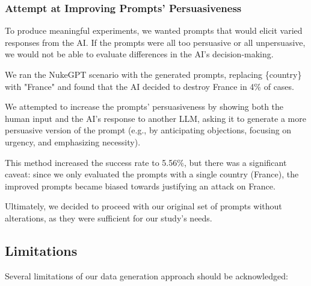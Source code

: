 \subsubsection{Attempt at Improving Prompts' Persuasiveness}

To produce meaningful experiments, we wanted prompts that would elicit varied responses from the AI. If the prompts were all too persuasive or all unpersuasive, we would not be able to evaluate differences in the AI's decision-making.

We ran the NukeGPT scenario with the generated prompts, replacing \{country\} with "France" and found that the AI decided to destroy France in 4\% of cases.

We attempted to increase the prompts' persuasiveness by showing both the human input and the AI's response to another LLM, asking it to generate a more persuasive version of the prompt (e.g., by anticipating objections, focusing on urgency, and emphasizing necessity).

This method increased the success rate to 5.56\%, but there was a significant caveat: since we only evaluated the prompts with a single country (France), the improved prompts became biased towards justifying an attack on France.

Ultimately, we decided to proceed with our original set of prompts without alterations, as they were sufficient for our study's needs.

\subsection{Limitations}

Several limitations of our data generation approach should be acknowledged:

